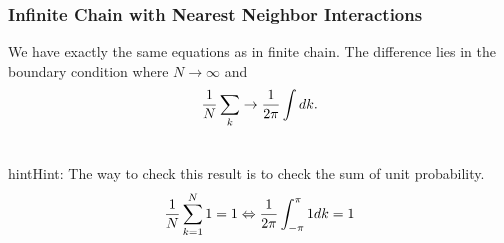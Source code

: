 \documentclass[letterpaper,10pt,english]{sphinxmanual}
\begin{document}
\subsubsection{Infinite Chain with Nearest Neighbor Interactions}
\label{nonequilibrium/week10:infinite-chain-with-nearest-neighbor-interactions}
We have exactly the same equations as in finite chain. The difference lies in the boundary condition where $N\rightarrow \infty$ and
\begin{gather}
\begin{split}\frac{1}{N}\sum_k \rightarrow \frac{1}{2\pi}\int dk .\end{split}\notag\\\begin{split}\end{split}\notag
\end{gather}
\begin{notice}{hint}{Hint:}
The way to check this result is to check the sum of unit probability.
\begin{gather}
\begin{split}\frac{1}{N}\sum_{k=1}^{N} 1 = 1 \Leftrightarrow \frac{1}{2\pi}\int_{-\pi}^{\pi} 1 dk = 1\end{split}\notag\\\begin{split}\end{split}\notag
\end{gather}\end{notice}
\end{document}
